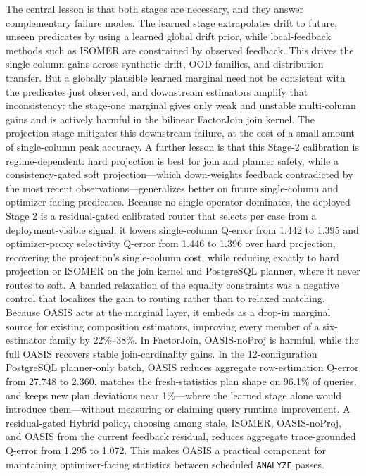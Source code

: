 \documentclass[preprint,12pt]{elsarticle}
\begin{document}
The central lesson is that both stages are necessary, and they answer
complementary failure modes. The learned stage extrapolates drift to future,
unseen predicates by using a learned global drift prior, while local-feedback
methods such as ISOMER are constrained by observed feedback. This drives the
single-column gains across synthetic drift, OOD families, and distribution
transfer. But a globally plausible learned marginal need not be consistent with
the predicates just observed, and downstream estimators amplify that
inconsistency: the stage-one marginal gives only weak and unstable multi-column
gains and is actively harmful in the bilinear FactorJoin join kernel. The
projection stage mitigates this downstream failure, at the cost of a small amount
of single-column peak accuracy. A further lesson is that this Stage-2 calibration
is regime-dependent: hard projection is best for join and planner safety, while a
consistency-gated soft projection---which down-weights feedback contradicted by
the most recent observations---generalizes better on future single-column and
optimizer-facing predicates. Because no single operator dominates, the deployed
Stage 2 is a residual-gated calibrated router that selects per case from a
deployment-visible signal; it lowers single-column Q-error from 1.442 to 1.395 and
optimizer-proxy selectivity Q-error from 1.446 to 1.396 over hard projection,
recovering the projection's single-column cost, while reducing exactly to hard
projection or ISOMER on the join kernel and PostgreSQL planner, where it never
routes to soft. A banded relaxation of the equality constraints was a negative
control that localizes the gain to routing rather than to relaxed matching.
Because OASIS acts at the marginal layer, it embeds as a
drop-in marginal source for existing composition estimators, improving every
member of a six-estimator family by 22\%--38\%. In FactorJoin, OASIS-noProj is
harmful, while the full OASIS recovers stable join-cardinality gains. In the
12-configuration PostgreSQL planner-only batch, OASIS reduces aggregate
row-estimation Q-error from 27.748 to 2.360, matches the fresh-statistics plan
shape on 96.1\% of queries, and keeps new plan deviations near 1\%---where the
learned stage alone would introduce them---without measuring or claiming query
runtime improvement. A residual-gated Hybrid policy, choosing among stale,
ISOMER, OASIS-noProj, and OASIS from the current feedback residual, reduces
aggregate trace-grounded Q-error from 1.295 to 1.072. This makes OASIS a
practical component for maintaining optimizer-facing statistics between scheduled
\texttt{ANALYZE} passes.
\end{document}
